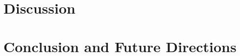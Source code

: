 \documentclass[openany]{book}
\begin{document}
\chapter{Discussion}


\chapter{Conclusion and Future Directions}



\renewcommand{\bibsection}{\chapter*{References}}


\thispagestyle{empty}



%
\end{document}
